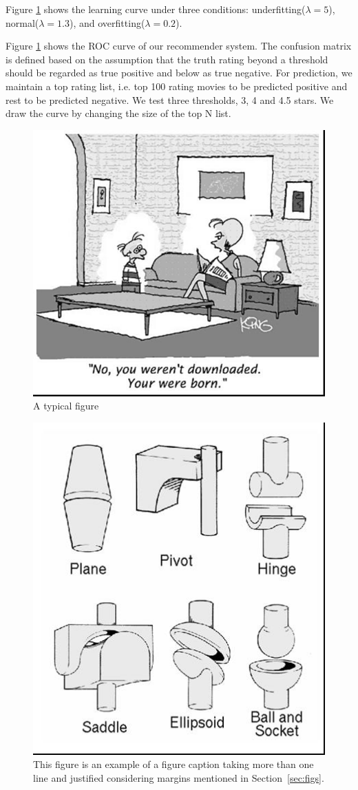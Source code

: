 \documentclass[12pt]{article}
\begin{document}
Figure \ref{fig:exampleFig1} shows the learning curve under three conditions: underfitting($\lambda = 5$), normal($\lambda = 1.3$), and overfitting($\lambda = 0.2$).

Figure \ref{fig:exampleFig1} shows the ROC curve of our recommender system. The confusion matrix is defined based on the assumption that the truth rating beyond a threshold should be regarded as true positive and below as true negative\cite{CF_Recsys_Survey}. For prediction, we maintain a top rating list, i.e. top 100 rating movies to be predicted positive and rest to be predicted negative. We test three thresholds, 3, 4 and 4.5 stars. We draw the curve by changing the size of the top N list.

\begin{figure}[ht]
\centering
\includegraphics[width=.5\textwidth]{fig1.jpg}
\caption{A typical figure}
\label{fig:exampleFig1}
\end{figure}

\begin{figure}[ht]
\centering
\includegraphics[width=.3\textwidth]{fig2.jpg}
\caption{This figure is an example of a figure caption taking more than one
  line and justified considering margins mentioned in Section~\ref{sec:figs}.}
\label{fig:exampleFig2}
\end{figure}
\end{document}
